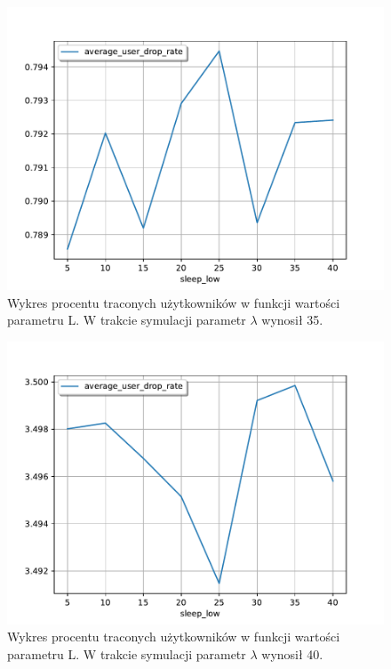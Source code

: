 \begin{figure}[h!]
\center
\includegraphics[scale=0.65]{img/drop_rate_lambda_35.pdf} 
\caption{Wykres procentu traconych użytkowników w funkcji wartości parametru L. W trakcie symulacji parametr $\lambda$ wynosił 35.}
\label{dropped_users_iter_l}
\end{figure}
\begin{figure}[h!]
\center
\includegraphics[scale=0.65]{img/drop_rate_lambda_40.pdf} 
\caption{Wykres procentu traconych użytkowników w funkcji wartości parametru L. W trakcie symulacji parametr $\lambda$ wynosił 40.}
\label{dropped_users_iter_l2}
\end{figure}

